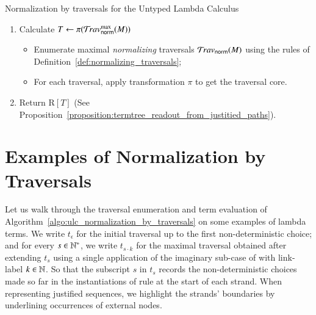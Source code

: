 \documentclass{elsarticle}
\theoremstyle{plain}
\theoremstyle{definition}
\newcommand{\normalizing}{{\sf norm}}
\newcommand{\travsetnorm}{\travset_\normalizing} %
\def\readout{\mathrm{R}} %
\def\coresymbol{\pi} %
\newcommand{\core}[1]{\coresymbol(#1)} %
\begin{document}
\begin{algorithm}%
\begin{algorithmic}
\caption{Normalization by traversals for the Untyped Lambda Calculus}
\label{algo:ulc_normalization_by_traversals}
\begin{enumerate}[nosep]
  \item Calculate $T \leftarrow \core{\travsetnorm^{\max}(M)}$
  \begin{itemize}[leftmargin=0.5em,nosep]
    \item Enumerate maximal \emph{normalizing} traversals $\travsetnorm(M)$ using the rules of Definition~\ref{def:normalizing_traversals};
    \item For each traversal, apply transformation $\coresymbol$ to get the traversal core.
  \end{itemize}
  \item Return $\readout[T]$ (See Proposition~\ref{proposition:termtree_readout_from_justitied_paths}).
\end{enumerate}
\end{algorithmic}
\end{algorithm}

\section{Examples of Normalization by Traversals}
\label{sec:examples}
Let us walk through the traversal enumeration and term evaluation of Algorithm~\ref{algo:ulc_normalization_by_traversals} on some examples of lambda terms. We write $t_\epsilon$  for the initial traversal up to the first non-deterministic choice; and for every $s \in \mathbb{N}^*$, we write $t_{s \cdot k}$ for the maximal traversal obtained after extending $t_s$ using a single application of the imaginary sub-case of  with link-label $k \in \mathbb{N}$. So that the subscript $s$ in $t_s$ records the non-deterministic choices made so far in the instantiations of rule 
at the start of each strand.
When representing justified sequences, we
highlight the strands' boundaries by underlining occurrences of external nodes.
\end{document}
